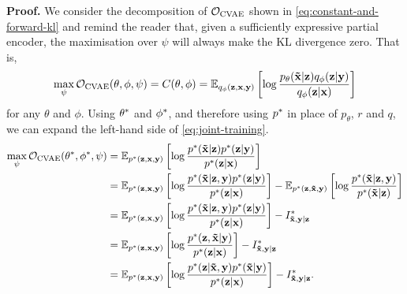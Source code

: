 \textbf{Proof.} 
We consider the decomposition of ${\mathcal{O}}_\text{CVAE}$ shown in
\cref{eq:constant-and-forward-kl} and remind the reader that, given a
sufficiently expressive partial encoder, the maximisation over $\psi$ will
always make the KL divergence zero. That is,
\begin{equation}
  \max_{\psi } {\mathcal{O}}_\text{CVAE}(\theta, \phi, \psi ) = C(\theta, \phi) = \mathbb{E}_{q_\phi({\mathbf{z}},{\mathbf{x}},{\mathbf{y}})} \left[ \log \frac{p_\theta(\mathbf{\tilde{x}}{}|{\mathbf{z}})q_\phi({\mathbf{z}}|{\mathbf{y}})}{q_\phi({\mathbf{z}}|{\mathbf{x}})} \right] \label{eq:forward-max-phi}
\end{equation}
for any $\theta$ and $\phi$. Using ${\theta}^*$ and ${\phi}^*$, and
therefore using ${p}^*{}$ in place of $p_\theta$, $r$ and $q$, we can expand the
left-hand side of \cref{eq:joint-training}.
\begin{align}
  \max_{\psi } {\mathcal{O}}_\text{CVAE}({\theta}^*, {\phi}^*, \psi ) &= \mathbb{E}_{{p}^*{}({\mathbf{z}},{\mathbf{x}},{\mathbf{y}})} \left[ \log \frac{{p}^*{}(\mathbf{\tilde{x}}{}|{\mathbf{z}}){p}^*{}({\mathbf{z}}|{\mathbf{y}})}{{p}^*({\mathbf{z}}|{\mathbf{x}})} \right] \\
                                                                                           &= \mathbb{E}_{{p}^*{}({\mathbf{z}},{\mathbf{x}},{\mathbf{y}})} \left[ \log \frac{{p}^*{}(\mathbf{\tilde{x}}{}|{\mathbf{z}},{\mathbf{y}}){p}^*{}({\mathbf{z}}|{\mathbf{y}})}{{p}^*({\mathbf{z}}|{\mathbf{x}})} \right] - \mathbb{E}_{{p}^*{}({\mathbf{z}},\mathbf{\tilde{x}}{},{\mathbf{y}})} \left[ \log\frac{{p}^*{}(\mathbf{\tilde{x}}{}|{\mathbf{z}},{\mathbf{y}})}{{p}^*{}(\mathbf{\tilde{x}}{}|{\mathbf{z}})} \right] \\
                                                                                           &= \mathbb{E}_{{p}^*{}({\mathbf{z}},{\mathbf{x}},{\mathbf{y}})} \left[ \log \frac{{p}^*{}(\mathbf{\tilde{x}}{}|{\mathbf{z}},{\mathbf{y}}){p}^*{}({\mathbf{z}}|{\mathbf{y}})}{{p}^*({\mathbf{z}}|{\mathbf{x}})} \right] - I^*_{\mathbf{\tilde{x}}{},\mathbf{y}{}|\mathbf{z}{}}{}\\
                                                                                           &= \mathbb{E}_{{p}^*{}({\mathbf{z}},{\mathbf{x}},{\mathbf{y}})} \left[ \log \frac{{p}^*{}({\mathbf{z}},\mathbf{\tilde{x}}{}|{\mathbf{y}})}{{p}^*({\mathbf{z}}|{\mathbf{x}})} \right] - I^*_{\mathbf{\tilde{x}}{},\mathbf{y}{}|\mathbf{z}{}}{}\\
                                                                                           &= \mathbb{E}_{{p}^*{}({\mathbf{z}},{\mathbf{x}},{\mathbf{y}})} \left[ \log \frac{{p}^*{}({\mathbf{z}}|\mathbf{\tilde{x}}{},{\mathbf{y}}){p}^*{}(\mathbf{\tilde{x}}{}|{\mathbf{y}})}{{p}^*({\mathbf{z}}|{\mathbf{x}})} \right] - I^*_{\mathbf{\tilde{x}}{},\mathbf{y}{}|\mathbf{z}{}}{}. \label{eq:pre-mapping}
\end{align}
